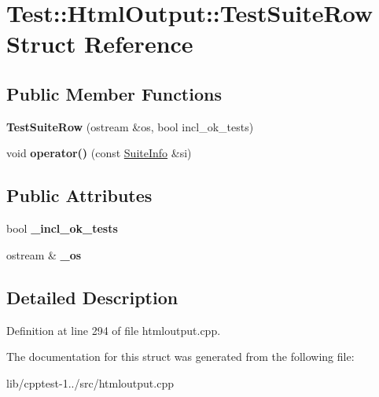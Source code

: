 \hypertarget{struct_test_1_1_html_output_1_1_test_suite_row}{}\section{Test\+:\+:Html\+Output\+:\+:Test\+Suite\+Row Struct Reference}
\label{struct_test_1_1_html_output_1_1_test_suite_row}
\subsection*{Public Member Functions}
\begin{DoxyCompactItemize}
\item 
{\bfseries Test\+Suite\+Row} (ostream \&os, bool incl\+\_\+ok\+\_\+tests)\hypertarget{struct_test_1_1_html_output_1_1_test_suite_row_a875f5d4cce18583a1bc85d172c4685f4}{}\label{struct_test_1_1_html_output_1_1_test_suite_row_a875f5d4cce18583a1bc85d172c4685f4}

\item 
void {\bfseries operator()} (const \hyperlink{struct_test_1_1_collector_output_1_1_suite_info}{Suite\+Info} \&si)\hypertarget{struct_test_1_1_html_output_1_1_test_suite_row_a11f6791bdfd956514d843cbe0646a0c0}{}\label{struct_test_1_1_html_output_1_1_test_suite_row_a11f6791bdfd956514d843cbe0646a0c0}

\end{DoxyCompactItemize}
\subsection*{Public Attributes}
\begin{DoxyCompactItemize}
\item 
bool {\bfseries \+\_\+incl\+\_\+ok\+\_\+tests}\hypertarget{struct_test_1_1_html_output_1_1_test_suite_row_ad6af18d9f22c23ecf195015cead69128}{}\label{struct_test_1_1_html_output_1_1_test_suite_row_ad6af18d9f22c23ecf195015cead69128}

\item 
ostream \& {\bfseries \+\_\+os}\hypertarget{struct_test_1_1_html_output_1_1_test_suite_row_a64359aaeb40719886258eeb8864c0c04}{}\label{struct_test_1_1_html_output_1_1_test_suite_row_a64359aaeb40719886258eeb8864c0c04}

\end{DoxyCompactItemize}


\subsection{Detailed Description}


Definition at line 294 of file htmloutput.\+cpp.



The documentation for this struct was generated from the following file\+:\begin{DoxyCompactItemize}
\item 
lib/cpptest-\/1../src/htmloutput.\+cpp\end{DoxyCompactItemize}
